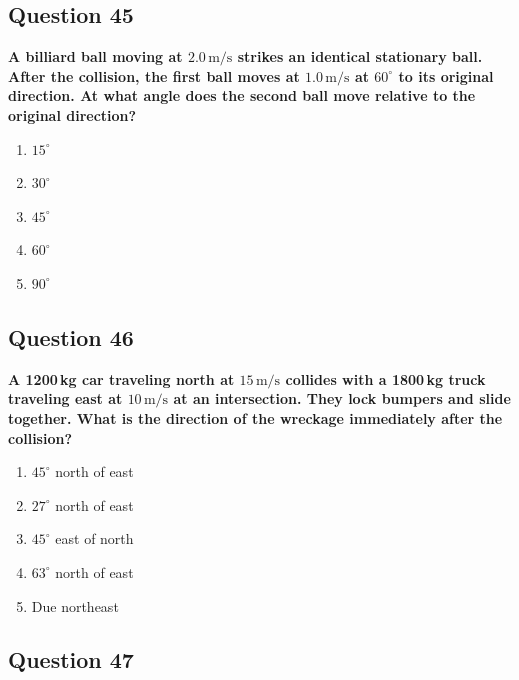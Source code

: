\documentclass[12pt,letterpaper]{article}
\begin{document}
\subsection{Question 45}

\begin{questionbox}
\textbf{A billiard ball moving at $2.0\,\text{m/s}$ strikes an identical stationary ball. After the collision, the first ball moves at $1.0\,\text{m/s}$ at $60^\circ$ to its original direction. At what angle does the second ball move relative to the original direction?}

\begin{enumerate}[label=\alph*)]
    \item $15^\circ$
    \item $30^\circ$
    \item $45^\circ$
    \item $60^\circ$
    \item $90^\circ$
\end{enumerate}
\end{questionbox}

\subsection{Question 46}

\begin{questionbox}
\textbf{A 1200\,kg car traveling north at $15\,\text{m/s}$ collides with a 1800\,kg truck traveling east at $10\,\text{m/s}$ at an intersection. They lock bumpers and slide together. What is the direction of the wreckage immediately after the collision?}

\begin{enumerate}[label=\alph*)]
    \item $45^\circ$ north of east
    \item $27^\circ$ north of east
    \item $45^\circ$ east of north
    \item $63^\circ$ north of east
    \item Due northeast
\end{enumerate}
\end{questionbox}

\subsection{Question 47}
\end{document}
